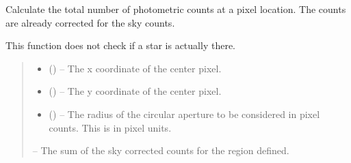 \documentclass[letterpaper,11pt,english]{sphinxmanual}
\begin{document}
\begin{savenotes}
\begin{fulllineitems}
\begin{savenotes}
\begin{fulllineitems}
\begin{quote}
\begin{description}
\end{description}\end{quote}

\end{fulllineitems}\end{savenotes}


\begin{savenotes}\begin{fulllineitems}
\label{\detokenize{code/opihiexarata.photometry.solution:opihiexarata.photometry.solution.PhotometricSolution.calculate_star_photon_counts_pixel}}
\pysigstartsignatures
{}
\pysigstopsignatures
\sphinxAtStartPar
Calculate the total number of photometric counts at a pixel
location. The counts are already corrected for the sky counts.

\sphinxAtStartPar
This function does not check if a star is actually there.
\begin{quote}\begin{description}
\begin{itemize}
\item {} 
\sphinxAtStartPar
{} () – The x coordinate of the center pixel.

\item {} 
\sphinxAtStartPar
{} () – The y coordinate of the center pixel.

\item {} 
\sphinxAtStartPar
{} () – The radius of the circular aperture to be considered in pixel
counts. This is in pixel units.

\end{itemize}

\sphinxAtStartPar
{} – The sum of the sky corrected counts for the region defined.


\end{description}
\end{quote}
\end{fulllineitems}
\end{savenotes}
\end{fulllineitems}
\end{savenotes}
\end{document}
